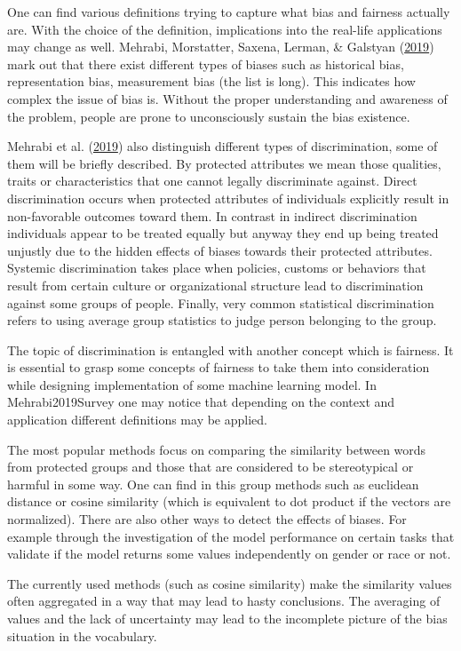 \documentclass[12pt,]{book}
\begin{document}
One can find various definitions trying to capture what bias and
fairness actually are. With the choice of the definition, implications
into the real-life applications may change as well. Mehrabi, Morstatter,
Saxena, Lerman, \& Galstyan
(\protect\hyperlink{ref-Mehrabi2019Survey}{2019}) mark out that there
exist different types of biases such as historical bias, representation
bias, measurement bias (the list is long). This indicates how complex
the issue of bias is. Without the proper understanding and awareness of
the problem, people are prone to unconsciously sustain the bias
existence.

Mehrabi et al. (\protect\hyperlink{ref-Mehrabi2019Survey}{2019}) also
distinguish different types of discrimination, some of them will be
briefly described. By protected attributes we mean those qualities,
traits or characteristics that one cannot legally discriminate against.
Direct discrimination occurs when protected attributes of individuals
explicitly result in non-favorable outcomes toward them. In contrast in
indirect discrimination individuals appear to be treated equally but
anyway they end up being treated unjustly due to the hidden effects of
biases towards their protected attributes. Systemic discrimination takes
place when policies, customs or behaviors that result from certain
culture or organizational structure lead to discrimination against some
groups of people. Finally, very common statistical discrimination refers
to using average group statistics to judge person belonging to the
group.

The topic of discrimination is entangled with another concept which is
fairness. It is essential to grasp some concepts of fairness to take
them into consideration while designing implementation of some machine
learning model. In Mehrabi2019Survey one may notice that depending on
the context and application different definitions may be applied.

The most popular methods focus on comparing the similarity between words
from protected groups and those that are considered to be stereotypical
or harmful in some way. One can find in this group methods such as
euclidean distance or cosine similarity (which is equivalent to dot
product if the vectors are normalized). There are also other ways to
detect the effects of biases. For example through the investigation of
the model performance on certain tasks that validate if the model
returns some values independently on gender or race or not.

The currently used methods (such as cosine similarity) make the
similarity values often aggregated in a way that may lead to hasty
conclusions. The averaging of values and the lack of uncertainty may
lead to the incomplete picture of the bias situation in the vocabulary.
\end{document}
